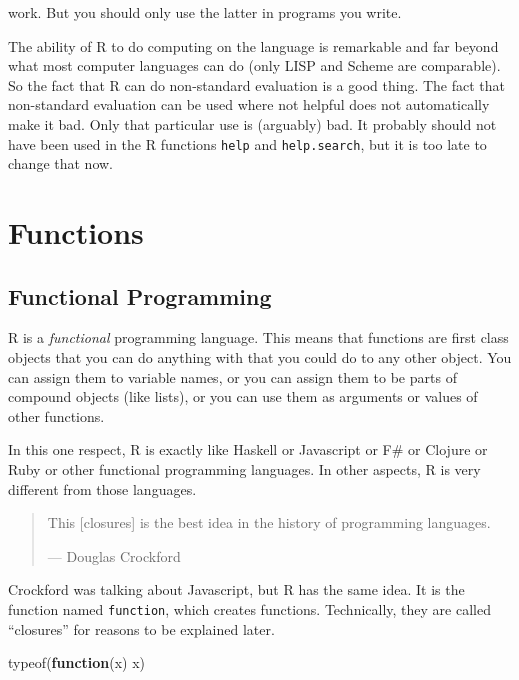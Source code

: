 \documentclass[
]{article}
\newenvironment{Shaded}{\begin{snugshade}}{\end{snugshade}}
\newcommand{\ControlFlowTok}[1]{\textcolor[rgb]{0.13,0.29,0.53}{\textbf{#1}}}
\newcommand{\FunctionTok}[1]{\textcolor[rgb]{0.00,0.00,0.00}{#1}}
\newcommand{\NormalTok}[1]{#1}
\begin{document}
work. But you should only use the latter in programs you write.

The ability of R to do computing on the language is remarkable and far
beyond what most computer languages can do (only LISP and Scheme are
comparable). So the fact that R can do non-standard evaluation is a good
thing. The fact that non-standard evaluation can be used where not
helpful does not automatically make it bad. Only that particular use is
(arguably) bad. It probably should not have been used in the R functions
\texttt{help} and \texttt{help.search}, but it is too late to change
that now.

\hypertarget{functions}{%
\section{Functions}\label{functions}}

\hypertarget{functional-programming}{%
\subsection{Functional Programming}\label{functional-programming}}

R is a \emph{functional} programming language. This means that functions
are first class objects that you can do anything with that you could do
to any other object. You can assign them to variable names, or you can
assign them to be parts of compound objects (like lists), or you can use
them as arguments or values of other functions.

In this one respect, R is exactly like Haskell or Javascript or F\# or
Clojure or Ruby or other functional programming languages. In other
aspects, R is very different from those languages.

\begin{quote}
This {[}closures{]} is the best idea in the history of programming
languages.

--- Douglas Crockford
\end{quote}

Crockford was talking about Javascript, but R has the same idea. It is
the function named \texttt{function}, which creates functions.
Technically, they are called ``closures'' for reasons to be explained
later.

\begin{Shaded}
\begin{Highlighting}[]
\FunctionTok{typeof}\NormalTok{(}\ControlFlowTok{function}\NormalTok{(x) x)}
\end{Highlighting}
\end{Shaded}
\end{document}
